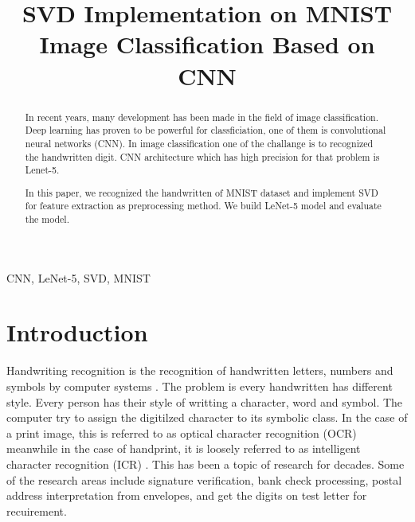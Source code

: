 \documentclass[conference]{IEEEtran}
\begin{document}
\title{SVD Implementation on MNIST Image Classification Based on CNN\\
}

\author{
}

\maketitle

\begin{abstract}
In recent years, many development has been made in the field of image classification. Deep learning has proven to be powerful for classficiation, one of them is convolutional neural networks (CNN). 
In image classification one of the challange is to recognized the handwritten digit. 
CNN architecture which has high precision for that problem is Lenet-5.

In this paper, we recognized the handwritten of MNIST dataset and implement SVD for feature extraction as preprocessing method. 
We build LeNet-5 model and evaluate the model. 
\end{abstract}

\begin{IEEEkeywords}
CNN, LeNet-5, SVD, MNIST
\end{IEEEkeywords}

\section{Introduction}
Handwriting recognition is the recognition of handwritten letters, numbers and symbols by computer systems \cite{maad2015}.
The problem is every handwritten has different style. 
Every person has their style of writting a character, word and symbol. 
The computer try to assign the digitilzed character to its symbolic class. 
In the case of a print image, this is referred to as optical character recognition (OCR) 
meanwhile in the case of handprint, it is loosely referred to as intelligent character recognition (ICR) \cite{824821}.
This has been a topic of research for decades. 
Some of the research areas include signature verification, bank check processing, postal address interpretation from envelopes, and get the digits on test letter for recuirement.
\end{document}
